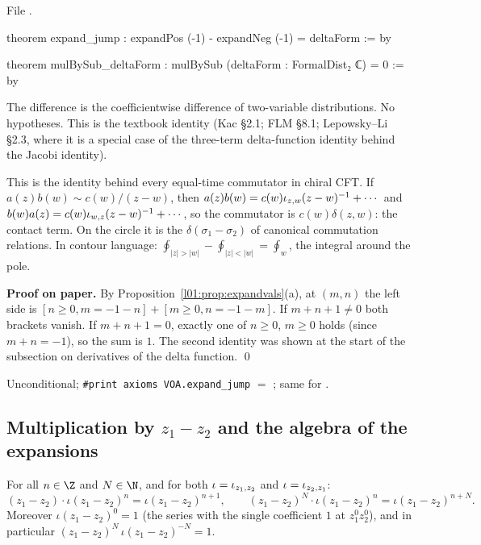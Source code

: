\noindent File .
\begin{leancode}
theorem expand_jump : expandPos (-1) - expandNeg (-1) = deltaForm := by

theorem mulBySub_deltaForm : mulBySub (deltaForm : FormalDist₂ ℂ) = 0 := by
\end{leancode}

\begin{dictionary}
The difference is the coefficientwise difference of two-variable distributions. No hypotheses. This is the
textbook identity (Kac §2.1; FLM §8.1; Lepowsky--Li §2.3, where it is a special case of the three-term
delta-function identity behind the Jacobi identity).
\end{dictionary}

\begin{physics}
This is the identity behind every equal-time commutator in chiral CFT. If $a(z)b(w)\sim c(w)/(z-w)$, then
$a(z)b(w) = c(w)\iota_{z,w}(z-w)^{-1}+\cdots$ and $b(w)a(z) = c(w)\iota_{w,z}(z-w)^{-1}+\cdots$, so the commutator
is $c(w)\delta(z,w)$: the contact term. On the circle it is the $\delta(\sigma_1-\sigma_2)$ of canonical commutation
relations. In contour language: $\oint_{|z|>|w|}-\oint_{|z|<|w|} = \oint_{w}$, the integral around the pole.
\end{physics}

\textbf{Proof on paper.} By Proposition~\ref{l01:prop:expandvals}(a), at $(m,n)$ the left side is
$[n\ge0, m = -1-n]+[m\ge0, n = -1-m]$. If $m+n+1\ne0$ both brackets vanish. If $m+n+1 = 0$, exactly one of
$n\ge0$, $m\ge0$ holds (since $m+n = -1$), so the sum is $1$. The second identity was shown at the start of
the subsection on derivatives of the delta function. \qed

\begin{status}
Unconditional; \texttt{\#print axioms VOA.expand\_jump} $=$ ;
same for .
\end{status}

\subsection{Multiplication by \texorpdfstring{$z_1-z_2$}{z1-z2} and the algebra of the expansions}

\begin{proposition}\label{l01:prop:mulexpand}
For all $n\in\Z$ and $N\in\N$, and for both $\iota = \iota_{z_1,z_2}$ and $\iota = \iota_{z_2,z_1}$:
\begin{equation*}
  (z_1-z_2)\cdot\iota(z_1-z_2)^n = \iota(z_1-z_2)^{n+1},\qquad (z_1-z_2)^N\cdot\iota(z_1-z_2)^{n} = \iota(z_1-z_2)^{n+N}.
\end{equation*}
Moreover $\iota(z_1-z_2)^0 = 1$ (the series with the single coefficient $1$ at $z_1^0z_2^0$), and in particular
$(z_1-z_2)^N\,\iota(z_1-z_2)^{-N} = 1$.
\end{proposition}


